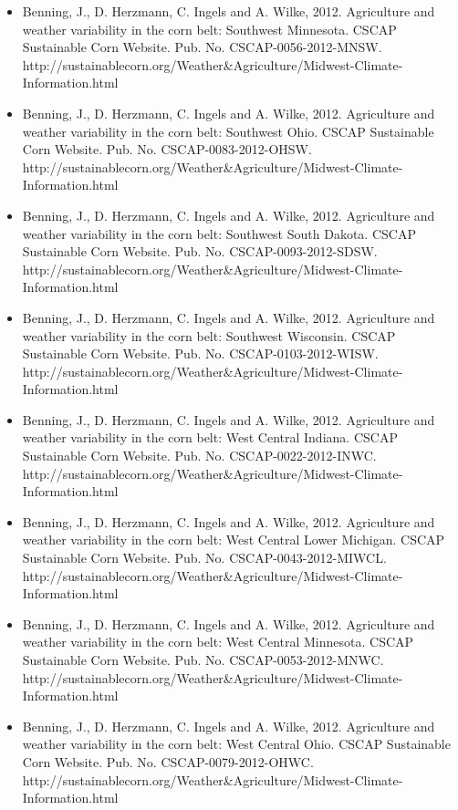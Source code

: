 \begin{itemize}
\item Benning, J., D. Herzmann, C. Ingels and A. Wilke, 2012. Agriculture and weather variability in the corn belt: Southwest Minnesota. CSCAP Sustainable Corn Website. Pub. No. CSCAP-0056-2012-MNSW. http://sustainablecorn.org/Weather\&Agriculture/Midwest-Climate-Information.html

\item Benning, J., D. Herzmann, C. Ingels and A. Wilke, 2012. Agriculture and weather variability in the corn belt: Southwest Ohio. CSCAP Sustainable Corn Website. Pub. No. CSCAP-0083-2012-OHSW. http://sustainablecorn.org/Weather\&Agriculture/Midwest-Climate-Information.html

\item Benning, J., D. Herzmann, C. Ingels and A. Wilke, 2012. Agriculture and weather variability in the corn belt: Southwest South Dakota. CSCAP Sustainable Corn Website. Pub. No. CSCAP-0093-2012-SDSW. http://sustainablecorn.org/Weather\&Agriculture/Midwest-Climate-Information.html

\item Benning, J., D. Herzmann, C. Ingels and A. Wilke, 2012. Agriculture and weather variability in the corn belt: Southwest Wisconsin. CSCAP Sustainable Corn Website. Pub. No. CSCAP-0103-2012-WISW. http://sustainablecorn.org/Weather\&Agriculture/Midwest-Climate-Information.html

\item Benning, J., D. Herzmann, C. Ingels and A. Wilke, 2012. Agriculture and weather variability in the corn belt: West Central Indiana. CSCAP Sustainable Corn Website. Pub. No. CSCAP-0022-2012-INWC. http://sustainablecorn.org/Weather\&Agriculture/Midwest-Climate-Information.html

\item Benning, J., D. Herzmann, C. Ingels and A. Wilke, 2012. Agriculture and weather variability in the corn belt: West Central Lower Michigan. CSCAP Sustainable Corn Website. Pub. No. CSCAP-0043-2012-MIWCL. http://sustainablecorn.org/Weather\&Agriculture/Midwest-Climate-Information.html

\item Benning, J., D. Herzmann, C. Ingels and A. Wilke, 2012. Agriculture and weather variability in the corn belt: West Central Minnesota. CSCAP Sustainable Corn Website. Pub. No. CSCAP-0053-2012-MNWC. http://sustainablecorn.org/Weather\&Agriculture/Midwest-Climate-Information.html

\item Benning, J., D. Herzmann, C. Ingels and A. Wilke, 2012. Agriculture and weather variability in the corn belt: West Central Ohio. CSCAP Sustainable Corn Website. Pub. No. CSCAP-0079-2012-OHWC. http://sustainablecorn.org/Weather\&Agriculture/Midwest-Climate-Information.html


\end{itemize}
